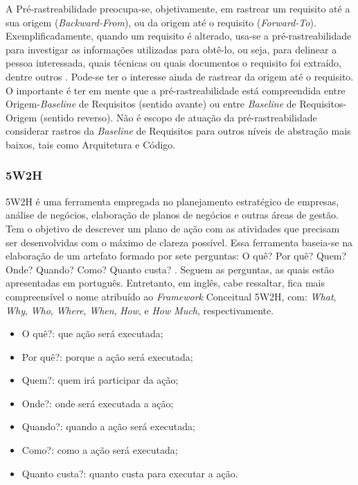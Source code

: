A Pré-rastreabilidade preocupa-se, objetivamente, em rastrear um requisito até a sua origem (\textit{Backward-From}), ou da origem até o requisito (\textit{Forward-To}). Exemplificadamente, quando um requisito é alterado, usa-se a pré-rastreabilidade para investigar as informações utilizadas para obtê-lo, ou seja, para delinear a pessoa interessada, quais técnicas ou quais documentos o requisito foi extraído, dentre outros \cite{pinheiro2004requirements}. Pode-se ter o interesse ainda de rastrear da origem até o requisito. O importante é ter em mente que a pré-rastreabilidade está compreendida entre Origem-\textit{Baseline} de Requisitos (sentido avante) ou entre \textit{Baseline} de Requisitos-Origem (sentido reverso). Não é escopo de atuação da pré-rastreabilidade considerar rastros da \textit{Baseline} de Requisitos para outros níveis de abstração mais baixos, tais como Arquitetura e Código.

\subsubsection{5W2H}

\label{sec:5w2h}

5W2H é uma ferramenta empregada no planejamento estratégico de empresas, análise de negócios, elaboração de planos de negócios e outras áreas de gestão. Tem o objetivo de descrever um plano de ação com as atividades que precisam ser desenvolvidas com o máximo de clareza possível. Essa ferramenta baseia-se na elaboração de um artefato formado por sete perguntas: O quê? Por quê? Quem? Onde? Quando? Como? Quanto custa? \cite{rabuskeuso}. Seguem as perguntas, as quais estão apresentadas em português. Entretanto, em inglês, cabe ressaltar, fica mais compreensível o nome atribuído ao \textit{Framework} Conceitual 5W2H, com: \textit{What}, \textit{Why}, \textit{Who}, \textit{Where}, \textit{When}, \textit{How}, e \textit{How Much}, respectivamente.

\begin{itemize}
    \item O quê?: que ação será executada;
    \item Por quê?: porque a ação será executada;
    \item Quem?: quem irá participar da ação;
    \item Onde?: onde será executada a ação;
    \item Quando?: quando a ação será executada;
    \item Como?: como a ação será executada;
    \item Quanto custa?: quanto custa para executar a ação.
\end{itemize}

